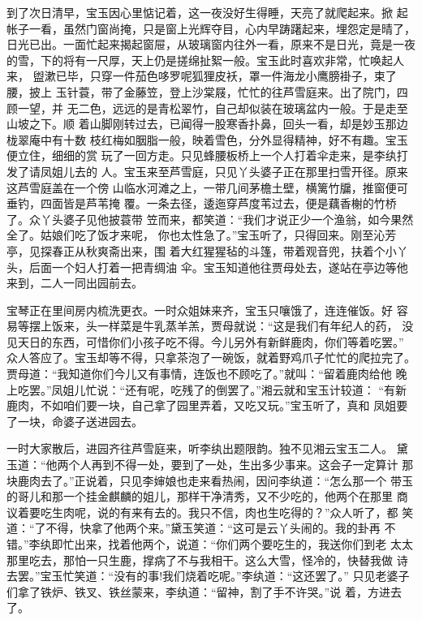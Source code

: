 到了次日清早，宝玉因心里惦记着，这一夜没好生得睡，天亮了就爬起来。掀
起帐子一看，虽然门窗尚掩，只是窗上光辉夺目，心内早踌躇起来，埋怨定是晴了，
日光已出。一面忙起来揭起窗屉，从玻璃窗内往外一看，原来不是日光，竟是一夜
的雪，下的将有一尺厚，天上仍是搓绵扯絮一般。宝玉此时喜欢非常，忙唤起人来，
盥漱已毕，只穿一件茄色哆罗呢狐狸皮袄，罩一件海龙小鹰膀褂子，束了腰，披上
玉针蓑，带了金藤笠，登上沙棠屐，忙忙的往芦雪庭来。出了院门，四顾一望，并
无二色，远远的是青松翠竹，自己却似装在玻璃盆内一般。于是走至山坡之下。顺
着山脚刚转过去，已闻得一股寒香扑鼻，回头一看，却是妙玉那边栊翠庵中有十数
枝红梅如胭脂一般，映着雪色，分外显得精神，好不有趣。宝玉便立住，细细的赏
玩了一回方走。只见蜂腰板桥上一个人打着伞走来，是李纨打发了请凤姐儿去的
人。宝玉来至芦雪庭，只见丫头婆子正在那里扫雪开径。原来这芦雪庭盖在一个傍
山临水河滩之上，一带几间茅檐土壁，横篱竹牖，推窗便可垂钓，四面皆是芦苇掩
覆。一条去径，逶迤穿芦度苇过去，便是藕香榭的竹桥了。众丫头婆子见他披蓑带
笠而来，都笑道：“我们才说正少一个渔翁，如今果然全了。姑娘们吃了饭才来呢，
你也太性急了。”宝玉听了，只得回来。刚至沁芳亭，见探春正从秋爽斋出来，围
着大红猩猩毡的斗篷，带着观音兜，扶着个小丫头，后面一个妇人打着一把青绸油
伞。宝玉知道他往贾母处去，遂站在亭边等他来到，二人一同出园前去。

宝琴正在里间房内梳洗更衣。一时众姐妹来齐，宝玉只嚷饿了，连连催饭。好
容易等摆上饭来，头一样菜是牛乳蒸羊羔，贾母就说：“这是我们有年纪人的药，
没见天日的东西，可惜你们小孩子吃不得。今儿另外有新鲜鹿肉，你们等着吃罢。”
众人答应了。宝玉却等不得，只拿茶泡了一碗饭，就着野鸡爪子忙忙的爬拉完了。
贾母道：“我知道你们今儿又有事情，连饭也不顾吃了。”就叫：“留着鹿肉给他
晚上吃罢。”凤姐儿忙说：“还有呢，吃残了的倒罢了。”湘云就和宝玉计较道：
“有新鹿肉，不如咱们要一块，自己拿了园里弄着，又吃又玩。”宝玉听了，真和
凤姐要了一块，命婆子送进园去。

一时大家散后，进园齐往芦雪庭来，听李纨出题限韵。独不见湘云宝玉二人。
黛玉道：“他两个人再到不得一处，要到了一处，生出多少事来。这会子一定算计
那块鹿肉去了。”正说着，只见李婶娘也走来看热闹，因问李纨道：“怎么那一个
带玉的哥儿和那一个挂金麒麟的姐儿，那样干净清秀，又不少吃的，他两个在那里
商议着要吃生肉呢，说的有来有去的。我只不信，肉也生吃得的？”众人听了，都
笑道：“了不得，快拿了他两个来。”黛玉笑道：“这可是云丫头闹的。我的卦再
不错。”李纨即忙出来，找着他两个，说道：“你们两个要吃生的，我送你们到老
太太那里吃去，那怕一只生鹿，撑病了不与我相干。这么大雪，怪冷的，快替我做
诗去罢。”宝玉忙笑道：“没有的事!我们烧着吃呢。”李纨道：“这还罢了。”
只见老婆子们拿了铁炉、铁叉、铁丝蒙来，李纨道：“留神，割了手不许哭。”说
着，方进去了。


